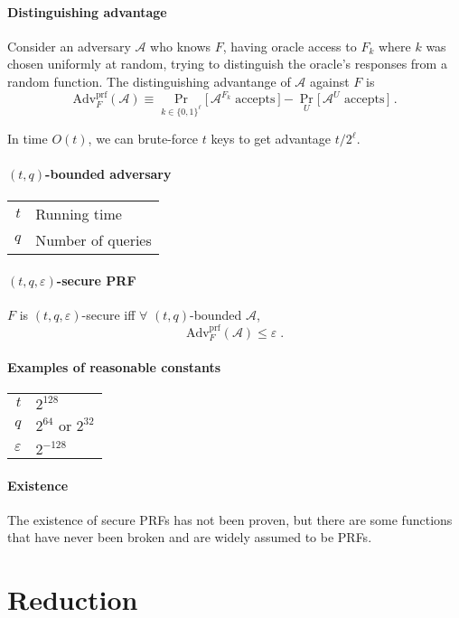 \documentclass[11pt]{article}
\newcommand{\eqdef}{\ensuremath{\equiv}}
\newcommand{\eps}{\ensuremath{\varepsilon}}
\theoremstyle{remark}
\begin{document}
\paragraph{Distinguishing advantage}
Consider an adversary $\mathcal{A}$ who knows $F$, having oracle access
to $F_k$ where $k$ was chosen uniformly at random, trying to
distinguish the oracle's responses from a random function.
The distinguishing advantange of $\mathcal{A}$ against $F$ is
\[ \textrm{Adv}_F^\textrm{prf}(\mathcal{A}) \eqdef
\Pr_{k\in\{0,1\}^\ell} \big[\, \mathcal{A}^{F_k}\;\textrm{accepts} \,\big]
- \Pr_U \big[\, \mathcal{A}^U \textrm{ accepts} \,\big] \;\textrm{.} \]

In time $O(t)$, we can brute-force $t$ keys to get
advantage $t / 2^\ell$.

\paragraph{$(t,q)$-bounded adversary}
\begin{tabular}{r|l}
$t$ & Running time \\
$q$ & Number of queries
\end{tabular}

\paragraph{$(t,q,\eps)$-secure PRF}
$F$ is $(t,q,\eps)$-secure iff
$\forall$ $(t,q)$-bounded $\mathcal{A}$,
\[ \textrm{Adv}_F^\textrm{prf}(\mathcal{A}) \le \eps \;\textrm{.} \]

\paragraph{Examples of reasonable constants}
\begin{tabular}{r|l}
$t$ & $2^{128}$ \\
$q$ & $2^{64}$ or $2^{32}$ \\
$\eps$ & $2^{-128}$
\end{tabular}

\paragraph{Existence}
The existence of secure PRFs has not been proven,
but there are some functions that have never been
broken and are widely assumed to be PRFs.

\section{Reduction}
\end{document}
